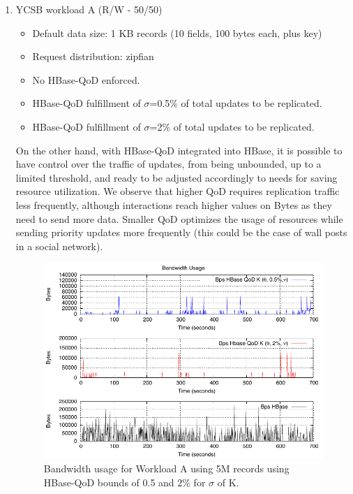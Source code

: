 \begin{enumerate}
\item{YCSB workload A (R/W - 50/50)}
	\begin{itemize}
	Read/update ratio: 50/50
	\item Default data size: 1 KB records (10 fields, 100 bytes each, plus key)
	\item Request distribution: zipfian
	\item No HBase-QoD enforced.
	\item HBase-QoD fulfillment of $\sigma$=0.5\% of total updates to be replicated.
	\item HBase-QoD fulfillment of $\sigma$=2\% of total updates to be replicated.
	\end{itemize}

On the other hand, with HBase-QoD integrated into HBase, it is possible to have control over the traffic of updates, from being unbounded, up to a limited threshold, and ready to be adjusted accordingly to needs for saving resource utilization. We observe that higher QoD requires replication traffic less frequently, although interactions reach higher values on Bytes as they need to send more data. Smaller QoD optimizes the usage of resources while sending priority updates more frequently (this could be the case of wall posts in a social network).

\begin{figure}
\centering
\includegraphics[scale=1.3]{figs/plot-packets-size-workloada-allbounds-latest.pdf}
\caption{Bandwidth usage for Workload A using 5M records using HBase-QoD bounds of 0.5 and 2\% for $\sigma$ of K.}
\label{fig-bandwidth-worloada}
\end{figure}


\end{enumerate}
